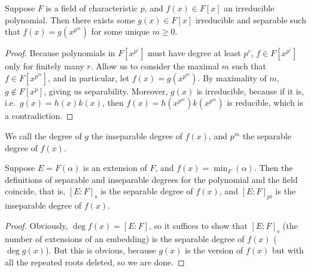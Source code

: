 \begin{proposition}\label{prop:separable-power-polynomial}
    Suppose \(F\) is a field of characteristic \(p\),
    and \(f(x) \in F[x]\) an irreducible polynomial.
    Then there exists some \(g(x) \in F[x]\) irreducible and separable
    such that \(f(x) = g(x^{p^m})\) for some unique \(m \geq 0\).
\end{proposition}
\begin{proof}
    Because polynomials in \(F[x^{p^r}]\) must have degree at least \(p^r\),
    \(f \in F[x^{p^r}]\) only for finitely many \(r\).
    Allow us to consider the maximal \(m\) such that \(f \in F[x^{p^m}]\),
    and in particular, let \(f(x) = g(x^{p^m})\).
    By maximality of \(m\), \(g \notin F[x^p]\), giving us separability.
    Moreover, \(g(x)\) is irreducible, because if it is, i.e.\ \(g(x) = h(x)k(x)\),
    then \(f(x) = h(x^{p^m})k(x^{p^m})\) is reducible, which is a contradiction.
\end{proof}
\begin{definition}
    We call the degree of \(g\) the inseparable degree of \(f(x)\),
    and \(p^m\) the separable degree of \(f(x)\).
\end{definition}
\begin{proposition}\label{prop:separable-degree-polynomial}
    Suppose \(E = F(\alpha)\) is an extension of \(F\),
    and \(f(x) = \min_F(\alpha)\).
    Then the definitions of separable and inseparable degrees
    for the polynomial and the field coincide,
    that is, \({[E:F]}_s\) is the separable degree of \(f(x)\),
    and \({[E:F]}_{pi}\) is the inseparable degree of \(f(x)\).
\end{proposition}
\begin{proof}
    Obviously, \(\deg f(x) = [E:F]\),
    so it suffices to show that \({[E:F]}_s\) (the number of extensions of an embedding)
    is the separable degree of \(f(x)\) (\(\deg g(x)\)).
    But this is obvious, because \(g(x)\) is the version of \(f(x)\)
    but with all the repeated roots deleted, so we are done.
\end{proof}


